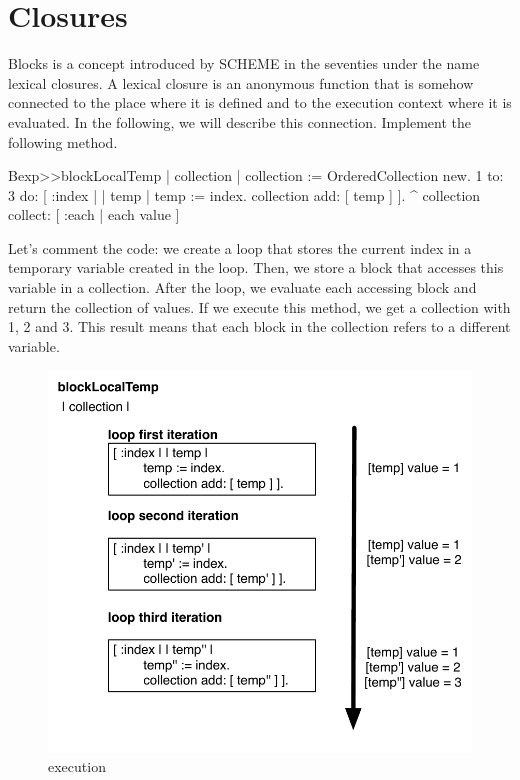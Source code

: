 \documentclass[a4paper,10pt,twoside]{book}
\begin{document}
\section{Closures}

Blocks is a concept introduced by SCHEME in the seventies under the name lexical closures. A lexical closure is an anonymous function that is somehow connected to the place where it is defined and to the execution context where it is evaluated. In the following, we will describe this connection. Implement the following method.

\begin{code}{}
Bexp>>blockLocalTemp
	| collection |
	collection := OrderedCollection new.
	1 to: 3 do: [ :index |
		| temp |
		temp := index.
		collection add: [ temp ] ].
	^ collection collect: [ :each | each value ]
\end{code}

Let's comment the code: we create a loop that stores the current index in a temporary variable  created in the loop. Then, we store a block that accesses this variable in a collection. After the loop, we evaluate each accessing block and return the collection of values. If we execute this method, we get a collection with 1, 2 and 3. This result means that each block in the collection refers to a different  variable.

\begin{figure}
	\centering
        \includegraphics[width=0.7\linewidth]{blockClosureLocalTemp}
	\caption{ execution}
	\label{fig:blockLocalTempExecution}
\end{figure}
\end{document}
